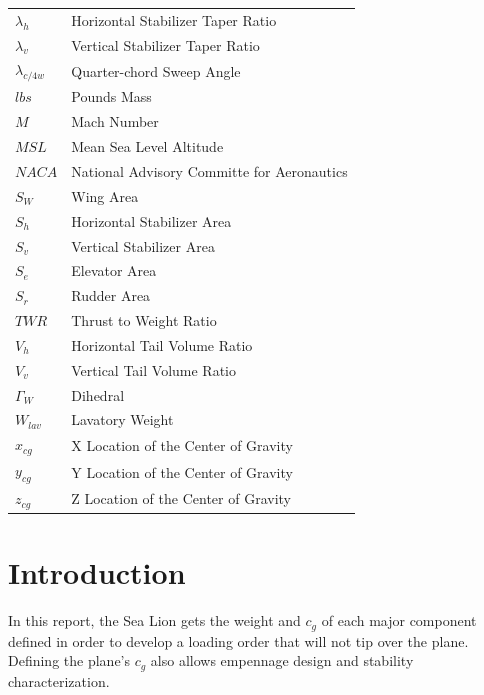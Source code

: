 \documentclass[conf]{new-aiaa}
\begin{document}
{\begin{longtable*}{@{}l @{\quad=\quad} l@{}}
$\lambda_h$	               & Horizontal Stabilizer Taper Ratio                        \\
$\lambda_v$	               & Vertical Stabilizer Taper Ratio                        \\
$\lambda_{c/4w}$           & Quarter-chord Sweep Angle          \\
$lbs$                      & Pounds Mass \\
$M$                        & Mach Number \\
$MSL$     	               & Mean Sea Level Altitude            \\
$NACA$                     & National Advisory Committe for Aeronautics \\
$S_W$     	               & Wing Area                          \\
$S_h$     	               & Horizontal Stabilizer Area \\
$S_v$     	               & Vertical Stabilizer Area  \\
$S_e$     	               & Elevator Area  \\
$S_r$     	               & Rudder Area  \\
$TWR$     	               & Thrust to Weight Ratio             \\
$V_h$     	               & Horizontal Tail Volume Ratio \\
$V_v$     	               & Vertical Tail Volume Ratio \\
$\Gamma_W$	               & Dihedral                           \\
$W_{lav}$	               & Lavatory Weight                           \\
$x_{cg}$	               & X Location of the Center of Gravity \\
$y_{cg}$	               & Y Location of the Center of Gravity \\
$z_{cg}$	               & Z Location of the Center of Gravity \\
\end{longtable*}}

\newpage
{}

\section{Introduction}
In this report, the Sea Lion gets the weight and $c_g$ of each major component defined in order to develop a loading order that will not tip over the plane. Defining the plane's $c_g$ also allows empennage design and stability characterization. 
\end{document}
